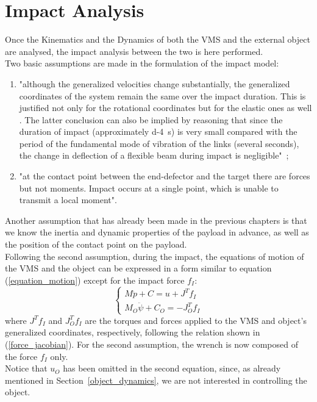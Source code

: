 \documentclass[a4paper,12pt,oneside]{report}
\begin{document}
\chapter{Impact Analysis}\label{impact_analysis}
Once the Kinematics and the Dynamics of both the VMS and the external object are analysed, the impact analysis between the two is here performed.\\
Two basic assumptions are made in the formulation of the impact model:
\begin{enumerate}
  \item "although the generalized velocities change substantially, the generalized coordinates of the system remain the same over the impact duration. This is justified not only for the rotational coordinates but for the elastic ones as well \cite{fifteen}. The latter conclusion can also be implied by reasoning that since the duration of impact (approximately \SI{d-4}{\second}) is very small compared with the period of the fundamental mode of vibration of the links (several seconds), the change in deflection of a flexible beam during impact is negligible"~\cite{fourteen};
  \item "at the contact point between the end-defector and the target there are forces but not moments. Impact occurs at a single point, which is unable to transmit a local moment"\cite{fourteen}.
\end{enumerate}
Another assumption that has already been made in the previous chapters is that we know the inertia and dynamic properties of the payload in advance, as well as the position of the contact point on the payload.\\
Following the second assumption, during the impact, the equations of motion of the VMS and the object can be expressed in a form similar to equation (\ref{equation_motion}) except for the impact force $f_I$:
\begin{equation}
  \begin{cases}
    M\ddot{p}+C=u+J^Tf_I\\
    M_O\ddot{\psi}+C_O=-J_O^Tf_I
  \end{cases}
  \label{initial_impact}
\end{equation}
where $J^Tf_I$ and $J_O^Tf_I$ are the torques and forces applied to the VMS and object's generalized coordinates, respectively, following the relation shown in (\ref{force_jacobian}). For the second assumption, the wrench is now composed of the force $f_I$ only.\\
Notice that $u_O$ has been omitted in the second equation, since, as already mentioned in Section~\ref{object_dynamics}, we are not interested in controlling the object.\\
\end{document}
